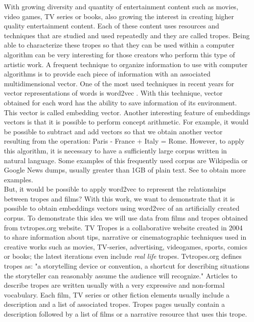 \documentclass[letterpaper]{article}
\begin{document}
   With growing diversity and quantity of entertainment content such as movies, video games, TV series or books, also growing the interest in creating higher quality entertainment content.
   Each of these content uses resources and techniques that are studied and used repeatedly and they are called tropes. Being able to characterize these tropes so that they can be used within a computer algorithm can be very interesting for those creators who perform this type of artistic work. A frequent technique to organize information to use with computer algorithms is to provide each piece of information with an associated multidimensional vector. One of the most used techniques in recent years for vector representations of words is word2vec \cite{mikolov2013}.
   With this technique, vector obtained for each word has the ability to save information of its environment. This vector is called embedding vector.  %
   Another interesting feature of embeddings vectors is that it is possible to perform concept arithmetic. For example, it would be possible to subtract and add vectors so that we obtain another vector resulting from the operation: Paris - France + Italy = Rome. However, to apply this algorithm, it is necessary to have a sufficiently large corpus written in natural language. Some examples of this frequently used corpus are Wikipedia or Google News dumps, usually greater than 1GB of plain text. See \cite{google-word2vec} to obtain more examples. \\
   
   But, it would be possible to apply word2vec to represent the relationships between tropes and films? With this work, we want to demonstrate that it is possible to obtain embeddings vectors using word2vec of an artificially created corpus. To demonstrate this idea we will use data from films and tropes obtained from tvtropes.org website. TV Tropes is a collaborative website created in 2004 to share information about tips, narrative or cinematographic techniques
   used in creative works such as movies, TV-series, advertising,
   videogames, sports, comics or books; the latest iterations even include
   {\em real life} tropes. Tvtropes.org defines tropes as:
   "a storytelling device or convention, a shortcut for describing
   situations the storyteller can reasonably assume the audience will
   recognize." Articles to describe tropes are written usually with a very
   expressive and non-formal vocabulary. 
   Each film, TV series or other fiction elements usually include a description and a list of associated tropes. Tropes pages usually contain a description followed by a list
   of films or a narrative resource that uses this trope.
    
\end{document}

